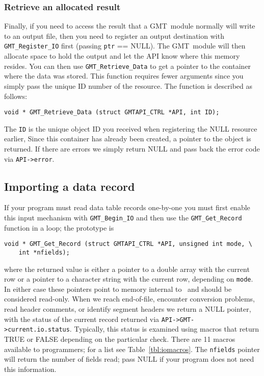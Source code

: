 \documentclass[11pt]{report}
\begin{document}
\subsubsection{Retrieve an allocated result}

Finally, if you need to access the result that a GMT\ module normally will write to an output file,
then you need to register an output destination with \texttt{GMT\_Register\_IO} first (passing \texttt{ptr} == NULL).
The GMT\ module will then allocate space to hold the output and let the API know where this memory resides.
You can then use \texttt{GMT\_Retrieve\_Data} to get a pointer to the container where the data was stored.
This function requires fewer arguments since you simply
pass the unique ID number of the resource.  The function is described as follows:


\begin{verbatim}
void * GMT_Retrieve_Data (struct GMTAPI_CTRL *API, int ID);
\end{verbatim}
The \texttt{ID} is the unique object ID you received when registering the NULL resource earlier,
Since this container has already been created, a pointer to the object is returned.
If there are errors we simply return NULL and pass back the error code via \texttt{API->error}.

\subsection{Importing a data record}

If your program must read data table records one-by-one you must first
enable this input mechanism with \texttt{GMT\_Begin\_IO} and then use the
\texttt{GMT\_Get\_Record} function in a loop; the prototype is

\begin{verbatim}
void * GMT_Get_Record (struct GMTAPI_CTRL *API, unsigned int mode, \
    int *nfields);
\end{verbatim}
where the returned value is either a pointer to a double array with the current row
or a pointer to a character string with the current row, depending on \texttt{mode}.
In either case these pointers point to memory internal to \GMT\ and should be considered read-only.
When we reach end-of-file, encounter conversion problems, read header comments, or identify
segment headers we return a NULL pointer, with the status of the current record returned via
\texttt{API->GMT->current.io.status}.  Typically, this status is examined using macros that
return TRUE or FALSE depending on the particular check.  There are 11 macros available to
programmers; for a list see Table~\ref{tbl:iomacros}.
The \texttt{nfields} pointer will return the number of fields read; pass NULL if your program
does not need this information.
\end{document}
